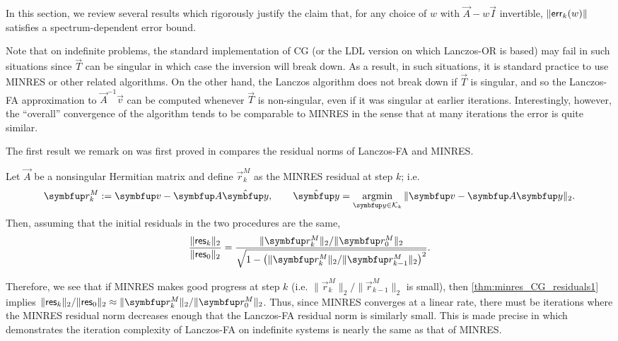 In this section, we review several results which rigorously justify the claim that, for any choice of \( w \) with \( \vec{A} - w\vec{I} \) invertible, \( \|\textup{\textsf{err}}_k(w)\| \) satisfies a spectrum-dependent error bound.


Note that on indefinite problems, the standard implementation of CG (or the LDL version on which Lanczos-OR is based) may fail in such situations since \( \vec{T} \) can be singular in which case the inversion will break down.
As a result, in such situations, it is standard practice to use MINRES or other related algorithms.
On the other hand, the Lanczos algorithm does not break down if \( \vec{T} \) is singular, and so the Lanczos-FA approximation to \( \vec{A}^{-1} \vec{v} \) can be computed whenever \( \vec{T} \) is non-singular, even if it was singular at earlier iterations. 
Interestingly, however, the ``overall'' convergence of the algorithm tends to be comparable to MINRES in the sense that at many iterations the error is quite similar.


The first result we remark on was first proved in \cite{cullum_greenbaum_96} compares the residual norms of Lanczos-FA and MINRES.
\begin{theorem}
\label{thm:minres_CG_residuals1}
Let \( \vec{A} \) be a nonsingular Hermitian matrix and define \( \vec{r}_k^M \) as the MINRES residual at step $k$; i.e. 
\begin{equation*}
    \vec{r}_k^M := \vec{v} - \vec{A} \hat{\vec{y}}
    ,\qquad
    \hat{\vec{y}} = \argmin_{\vec{y}\in\mathcal{K}_k} \| \vec{v} - \vec{A} \vec{y} \|_2 .
\end{equation*}
Then, assuming that the initial residuals in the two procedures are the same,
\begin{equation*}
    \frac{\| \Res_k  \|_2}{\|\Res_0\|_2} 
    = \frac{\| \vec{r}_{k}^M \|_2/\| \vec{r}_{0}^M\|_{2}}{\sqrt{1- \left( \| \vec{r}_{k}^M \|_2 / \| \vec{r}_{k-1}^M \|_2 \right)^2}}.
\end{equation*}
\end{theorem}

Therefore, we see that if MINRES makes good progress at step \( k \) (i.e. \( \| \vec{r}_k^M \|_2 / \| \vec{r}_{k-1}^M \|_2 \) is small), then \cref{thm:minres_CG_residuals1} implies \( \| \Res_k \|_2/\|\Res_0\|_2 \approx \| \vec{r}_k^M \|_2/\|\vec{r}_0^M\|_2 \).
Thus, since MINRES converges at a linear rate,
there must be iterations where the MINRES residual norm decreases enough that the Lanczos-FA residual norm is similarly small.
This is made precise in \cite[Corollary A.2]{chen_greenbaum_musco_musco_22a} which demonstrates the iteration complexity of Lanczos-FA on indefinite systems is nearly the same as that of MINRES.

